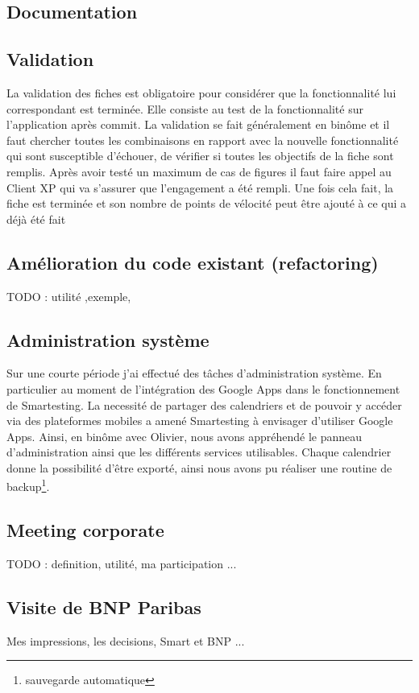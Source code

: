 \subsection{Documentation}

\subsection{Validation}
La validation des fiches est obligatoire pour considérer que la fonctionnalité lui correspondant est terminée. Elle consiste au test de la fonctionnalité sur l'application après commit. La validation se fait généralement en binôme et il faut chercher toutes les combinaisons en rapport avec la nouvelle fonctionnalité qui sont susceptible d'échouer, de vérifier si toutes les objectifs de la fiche sont remplis. Après avoir testé un maximum de cas de figures il faut faire appel au Client XP qui va s'assurer que l'engagement a été rempli. Une fois cela fait, la fiche est terminée et son nombre de points de vélocité peut être ajouté à ce qui a déjà été fait
\subsection{Amélioration du code existant (refactoring)}
TODO : utilité ,exemple, 
\subsection{Administration système}
Sur une courte période j'ai effectué des t\^aches d'administration système. En particulier au moment de l'intégration des Google Apps dans le fonctionnement de Smartesting. La necessité de partager des calendriers et de pouvoir y accéder via des plateformes mobiles a amené Smartesting à envisager d'utiliser Google Apps. Ainsi, en binôme avec Olivier, nous avons appréhendé le panneau d'administration ainsi que les différents services utilisables. Chaque calendrier donne la possibilité d'être exporté, ainsi nous avons pu réaliser une routine de backup\footnote{sauvegarde automatique}.
\subsection{Meeting corporate}
TODO : definition, utilité, ma participation ...
\subsection{Visite de BNP Paribas}
Mes impressions, les decisions, Smart et BNP ...

